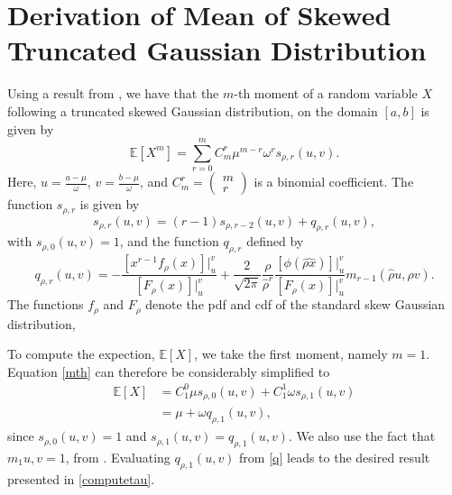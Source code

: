 \section{Derivation of Mean of Skewed Truncated Gaussian Distribution}

Using a result from \cite{skewed}, we have that the $m$-th moment of a random variable $X$ following a truncated skewed Gaussian distribution, on the domain $[a,b]$ is given by
\begin{equation}\label{mth}
\mathbb{E}[X^m]=\sum_{r=0}^mC_m^r\mu^{m-r}\omega^rs_{\rho,r}(u,v).
\end{equation}
Here, $u=\frac{a-\mu}{\omega}$, $v=\frac{b-\mu}{\omega}$, and $C_m^r=\begin{pmatrix}m\\r\end{pmatrix}$ is a binomial coefficient. The function $s_{\rho,r}$ is given by
\begin{equation}\label{s}
    s_{\rho,r}(u,v)=(r-1)s_{\rho,r-2}(u,v)+q_{\rho,r}(u,v),
\end{equation}
with $s_{\rho,0}(u,v)=1$, and the function $q_{\rho,r}$ defined by
\begin{equation}\label{q}
    q_{\rho,r}(u,v)=-\frac{\left[x^{r-1}f_\rho(x)\right]|_u^v}{\left[F_\rho(x)\right]|_u^v}+\frac{2}{\sqrt{2\pi}}\frac{\rho}{\hat{\rho}^r}\frac{\left[\phi(\hat{\rho x})\right]|_u^v}{\left[F_\rho(x)\right]|_u^v}m_{r-1}(\hat{\rho}u, \hat{\rho}v).
\end{equation}
The functions $f_\rho$ and $F_\rho$ denote the pdf and cdf of the standard skew Gaussian distribution,

 To compute the expection, $\mathbb{E}[X]$, we take the first moment, namely $m=1$. Equation \eqref{mth} can therefore be considerably simplified to
\begin{equation}
    \begin{split}
\mathbb{E}[X]&=C_1^0\mu s_{\rho,0}(u,v)+C_1^1\omega s_{\rho,1}(u,v)\\
&=\mu+\omega q_{\rho,1}(u,v),
\end{split}
\end{equation}
since $s_{\rho,0}(u,v)=1$ and $s_{\rho,1}(u,v)=q_{\rho,1}(u,v)$. We also use the fact that $m_1{u,v}=1$, from \cite{skewed}. Evaluating $q_{\rho,1}(u,v)$ from \eqref{q} leads to the desired result presented in \eqref{computetau}.
